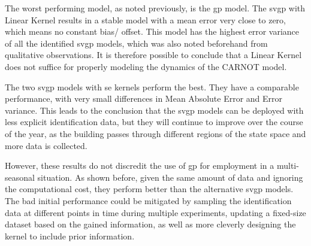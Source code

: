 The worst performing model, as noted previously, is the \acrshort{gp} model. The
\acrshort{svgp} with Linear Kernel results in a stable model with a mean error
very close to zero, which means no constant bias/ offset. This model has the
highest error variance of all the identified \acrshort{svgp} models, which was
also noted beforehand from qualitative observations. It is therefore possible to
conclude that a Linear Kernel does not suffice for properly modeling the
dynamics of the CARNOT model.

The two \acrshort{svgp} models with \acrlong{se} kernels perform the best. They
have a comparable performance, with very small differences in Mean Absolute
Error and Error variance. This leads to the conclusion that the \acrshort{svgp}
models can be deployed with less explicit identification data, but they will
continue to improve over the course of the year, as the building passes through
different regions of the state space and more data is collected.

However, these results do not discredit the use of \acrlong{gp} for employment
in a multi-seasonal situation. As shown before, given the same amount of data
and ignoring the computational cost, they perform better than the alternative
\acrshort{svgp} models. The bad initial performance could be mitigated by
sampling the identification data at different points in time during multiple
experiments, updating a fixed-size dataset based on the gained information, as
well as more cleverly designing the kernel to include prior information.


\clearpage
